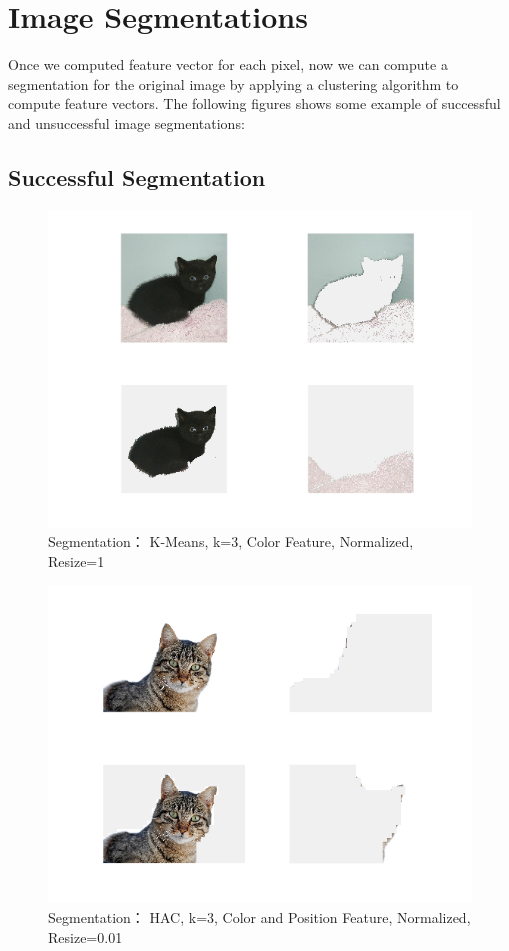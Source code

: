 \documentclass[12pt]{article}
\begin{document}
\section{Image Segmentations}
Once we computed feature vector for each pixel, now we can compute a segmentation for the original image by applying a clustering algorithm to compute  feature vectors.
\noindent
The following figures shows some example of successful and unsuccessful image segmentations:

\subsection{Successful Segmentation}
\begin{figure}[h!]
	\centering
    \includegraphics[scale=0.5]{seg_3_kmeans_color_true_1}
    \caption{Segmentation： K-Means, k=3, Color Feature, Normalized, Resize=1}
\end{figure}

\begin{figure}[h!]
	\centering
    \includegraphics[scale=0.45]{seg_3_hac_color_position_true_001}
    \caption{Segmentation： HAC, k=3, Color and Position Feature, Normalized, Resize=0.01}
\end{figure}
\end{document}
